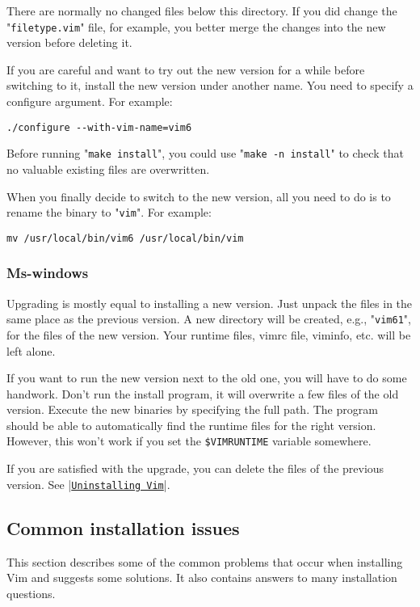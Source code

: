 There are normally no changed files below this directory.
If you did change the "\verb!filetype.vim!" file, for example, you better merge the changes into the new version before deleting it.

If you are careful and want to try out the new version for a while before switching to it, install the new version under another name.
You need to specify a configure argument.
For example:

\begin{Verbatim}[samepage=true]
 ./configure --with-vim-name=vim6
\end{Verbatim}

Before running "\verb!make install!", you could use "\verb!make -n install!" to check that no valuable existing files are overwritten.

When you finally decide to switch to the new version, all you need to do is to rename the binary to "\verb!vim!".
For example:

\begin{Verbatim}[samepage=true]
 mv /usr/local/bin/vim6 /usr/local/bin/vim
\end{Verbatim}

\subsubsection{Ms-windows}
Upgrading is mostly equal to installing a new version.
Just unpack the files in the same place as the previous version.
A new directory will be created, e.g., "\verb!vim61!", for the files of the new version.
Your runtime files, vimrc file, viminfo, etc. will be left alone.

If you want to run the new version next to the old one, you will have to do some handwork.
Don't run the install program, it will overwrite a few files of the old version.
Execute the new binaries by specifying the full path.
The program should be able to automatically find the runtime files for the right version.
However, this won't work if you set the \verb!$VIMRUNTIME! variable somewhere.

If you are satisfied with the upgrade, you can delete the files of the previous version.
See |\hyperref[Uninstalling Vim]{\texttt{Uninstalling Vim}}|.
\subsection{Common installation issues}
This section describes some of the common problems that occur when installing Vim and suggests some solutions.
It also contains answers to many installation questions.

